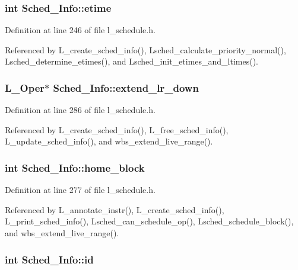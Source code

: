 \subsubsection{\setlength{\rightskip}{0pt plus 5cm}int \bf{Sched\_\-Info::etime}}\label{structSched__Info_6c085e39bf1a7416c80584c2aa39d705}




Definition at line 246 of file l\_\-schedule.h.

Referenced by L\_\-create\_\-sched\_\-info(), Lsched\_\-calculate\_\-priority\_\-normal(), Lsched\_\-determine\_\-etimes(), and Lsched\_\-init\_\-etimes\_\-and\_\-ltimes().
\subsubsection{\setlength{\rightskip}{0pt plus 5cm}L\_\-Oper$\ast$ \bf{Sched\_\-Info::extend\_\-lr\_\-down}}\label{structSched__Info_aa024cfcfaf259b832c203cc219cd151}




Definition at line 286 of file l\_\-schedule.h.

Referenced by L\_\-create\_\-sched\_\-info(), L\_\-free\_\-sched\_\-info(), L\_\-update\_\-sched\_\-info(), and wbs\_\-extend\_\-live\_\-range().
\subsubsection{\setlength{\rightskip}{0pt plus 5cm}int \bf{Sched\_\-Info::home\_\-block}}\label{structSched__Info_0729370674717d8dc073e8c8d795c3d1}




Definition at line 277 of file l\_\-schedule.h.

Referenced by L\_\-annotate\_\-instr(), L\_\-create\_\-sched\_\-info(), L\_\-print\_\-sched\_\-info(), Lsched\_\-can\_\-schedule\_\-op(), Lsched\_\-schedule\_\-block(), and wbs\_\-extend\_\-live\_\-range().
\subsubsection{\setlength{\rightskip}{0pt plus 5cm}int \bf{Sched\_\-Info::id}}\label{structSched__Info_bbb61a37f8f95573cce2103a89ac6f4c}




